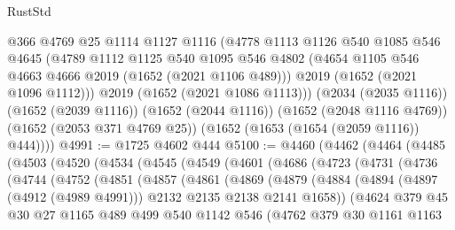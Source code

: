 \begin{lexlean}{RustStd}
\begin{coremodule}
        @366
        @4769
        @25
        @1114
        @1127
        @1116
        (@4778
          @1113
          @1126
          @540
          @1085
          @546
          @4645
          (@4789
            @1112
            @1125
            @540
            @1095
            @546
            @4802
            (@4654 @1105 @546 @4663 @4666 @2019 (@1652 (@2021 @1106 @489)))
            @2019
            (@1652 (@2021 @1096 @1112)))
          @2019
          (@1652 (@2021 @1086 @1113)))
        (@2034 (@2035 @1116))
        (@1652 (@2039 @1116))
        (@1652 (@2044 @1116))
        (@1652 (@2048 @1116 @4769))
        (@1652 (@2053 @371 @4769 @25))
        (@1652 (@1653 (@1654 (@2059 @1116)) @444))))
@4991 := @1725 @4602 @444
@5100 := @4460
    (@4462
      (@4464
        (@4485
          (@4503
            (@4520
              (@4534
                (@4545
                  (@4549
                    (@4601
                      (@4686
                        (@4723
                          (@4731
                            (@4736
                              (@4744
                                (@4752
                                  (@4851
                                    (@4857
                                      (@4861
                                        (@4869
                                          (@4879
                                            (@4884
                                              (@4894
                                                (@4897 (@4912 (@4989 @4991)))
                                                @2132
                                                @2135
                                                @2138
                                                @2141
                                                @1658))
                                            (@4624
                                              @379
                                              @45
                                              @30
                                              @27
                                              @1165
                                              @489
                                              @499
                                              @540
                                              @1142
                                              @546
                                              (@4762
                                                @379
                                                @30
                                                @1161
                                                @1163

\end{coremodule}
\end{lexlean}
